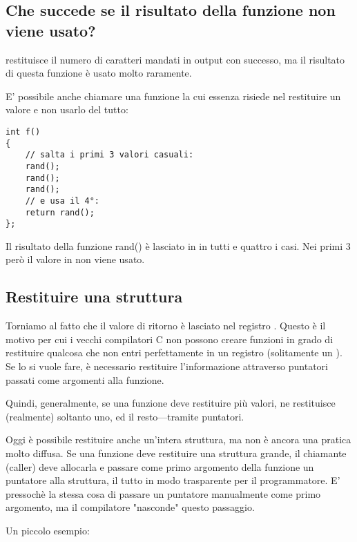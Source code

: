 \subsection{Che succede se il risultato della funzione non viene usato?}

\printf restituisce il numero di caratteri mandati in output con successo, ma il risultato di questa funzione
è usato molto raramente.

E' possibile anche chiamare una funzione la cui essenza risiede nel restituire un valore e non usarlo del tutto:

\begin{lstlisting}[style=customc]
int f()
{
    // salta i primi 3 valori casuali:
    rand();
    rand();
    rand();
    // e usa il 4°:
    return rand();
};
\end{lstlisting}

Il risultato della funzione rand() è lasciato in \EAX in tutti e quattro i casi.
Nei primi 3 però il valore in \EAX non viene usato.

\subsection{Restituire una struttura}


Torniamo al fatto che il valore di ritorno è lasciato nel registro \EAX.
Questo è il motivo per cui i vecchi compilatori C non possono creare funzioni in grado di restituire qualcosa che non entri perfettamente in un 
registro (solitamente un \Tint). Se lo si vuole fare, è necessario restituire l'informazione attraverso puntatori passati come argomenti alla funzione.

Quindi, generalmente, se una funzione deve restituire più valori, ne restituisce (realmente) soltanto uno, ed il resto---tramite puntatori.

Oggi è possibile restituire anche un'intera struttura, ma non è ancora una pratica molto diffusa.
Se una funzione deve restituire una struttura grande, il chiamante (\gls{caller}) deve allocarla e passare come primo argomento della funzione un puntatore alla struttura, il tutto in modo trasparente per il programmatore.
E' pressochè la stessa cosa di passare un puntatore manualmente come primo argomento, ma il compilatore "nasconde" questo passaggio.

Un piccolo esempio:



